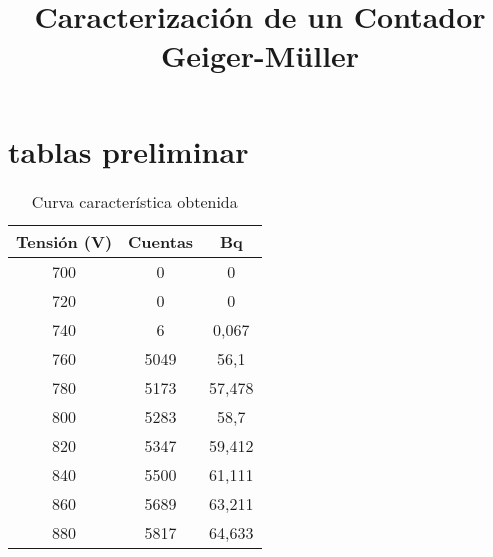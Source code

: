 \documentclass[a4paper,12pt,spanish]{article}
\begin{document}
	
	
	\title{Caracterización de un Contador Geiger-Müller}
	
	\date{}
	
	\maketitle
	
	
	
	
	
	
	
	
	\iffalse %
	\begin{abstract} %
		
		
		Pretendemos estudiar la conservación de la energía mecánica de un sólido con rotación y desplazamiento, y la determinación del momento de inercia de la rueda de Maxwell.
		
	1. Determinación de la curva característica con la meseta o ?plateau? del con-
	tador y de su pendiente. Tensión umbral y tensión de operación.
	2. Obtención del tiempo de resolución (Método de la dos fuentes).
	3. Determinación de la e?ciencia del detector, con muestras calibradas.
		
		
	\end{abstract} 
	\fi
	
\iffalse
I don't want this to happen
\fi


	\section{tablas preliminar}
	
	\begin{table}[h!]
		\centering
		\begin{tabular}{|c|c|c|}
			\hline
			Tensión (V) & Cuentas & Bq     \\ \hline
			700         & 0       & 0      \\ \hline
			720         & 0       & 0      \\ \hline
			740         & 6       & 0,067  \\ \hline
			760         & 5049    & 56,1   \\ \hline
			780         & 5173    & 57,478 \\ \hline
			800         & 5283    & 58,7   \\ \hline
			820         & 5347    & 59,412 \\ \hline
			840         & 5500    & 61,111 \\ \hline
			860         & 5689    & 63,211 \\ \hline
			880         & 5817    & 64,633 \\ \hline
		\end{tabular}
		\caption{Curva característica obtenida}
		\label{tab:my-table}
	\end{table}
	
\end{document}
